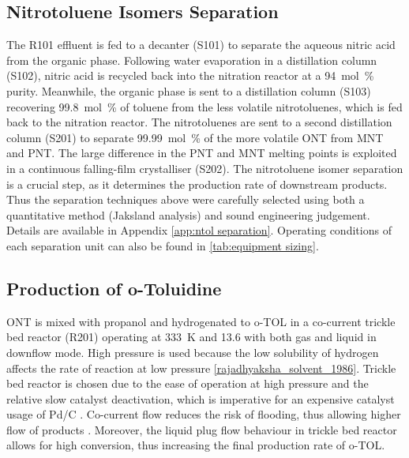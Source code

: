 
\subsection{Nitrotoluene Isomers Separation}
The R101 effluent is fed to a decanter (S101) to separate the aqueous nitric acid from the organic phase. Following water evaporation in a distillation column (S102), nitric acid is recycled back into the nitration reactor at a \SI{94}{mol\percent} purity.
Meanwhile, the organic phase is sent to a distillation column (S103) recovering \SI{99.8}{mol\percent} of toluene from the less volatile nitrotoluenes, which is fed back to the nitration reactor. The nitrotoluenes are sent to a second distillation column (S201) to separate \SI{99.99}{mol\percent} of the more volatile ONT from MNT and PNT. The large difference in the PNT and MNT melting points is exploited in a continuous falling-film crystalliser (S202). 
The nitrotoluene isomer separation is a crucial step, as it determines the production rate of downstream products. Thus the separation techniques above were carefully selected using both a quantitative method (Jaksland analysis) \cite{jaksland_separation_1995} and sound engineering judgement. Details are available in Appendix \ref{app:ntol separation}. Operating conditions of each separation unit can also be found in \cref{tab:equipment sizing}. 

\subsection{Production of o-Toluidine}
ONT is mixed with propanol and hydrogenated to o-TOL in a co-current trickle bed reactor (R201) operating at \SI{333}{\K} and \SI{13.6}{\atm} with both gas and liquid in downflow mode. High pressure is used because the low solubility of hydrogen affects the rate of reaction at low pressure \ref{rajadhyaksha_solvent_1986}. Trickle bed reactor is chosen due to the ease of operation at high pressure and the relative slow catalyst deactivation, which is imperative for an expensive catalyst usage of Pd/C \cite{vemala_hydrodynamic_nodate}. Co-current flow reduces the risk of flooding, thus allowing higher flow of products \cite{vemala_hydrodynamic_nodate}. Moreover, the liquid plug flow behaviour in trickle bed reactor allows for high conversion, thus increasing the final production rate of o-TOL. 

